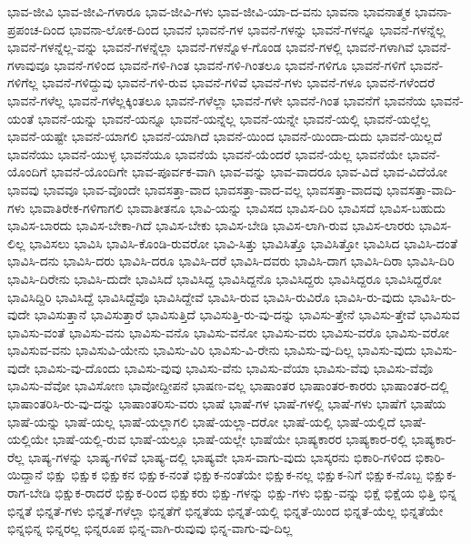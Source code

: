 {ಭಾವ-ಜೀವಿ
ಭಾವ-ಜೀವಿ-ಗಳಾರೂ
ಭಾವ-ಜೀವಿ-ಗಳು
ಭಾವ-ಜೀವಿ-ಯಾ-ದ-ವನು
ಭಾವನಾ
ಭಾವನಾತ್ಮಕ
ಭಾವನಾ-ಪ್ರಪಂಚ-ದಿಂದ
ಭಾವನಾ-ಲೋಕ-ದಿಂದ
ಭಾವನೆ
ಭಾವನೆ-ಗಳ
ಭಾವನೆ-ಗಳನ್ನು
ಭಾವನೆ-ಗಳನ್ನೂ
ಭಾವನೆ-ಗಳನ್ನೆಲ್ಲ
ಭಾವನೆ-ಗಳನ್ನೆಲ್ಲ-ವನ್ನು
ಭಾವನೆ-ಗಳನ್ನೆಲ್ಲಾ
ಭಾವನೆ-ಗಳನ್ನೊಳ-ಗೊಂಡ
ಭಾವನೆ-ಗಳಲ್ಲಿ
ಭಾವನೆ-ಗಳಾಗಿವೆ
ಭಾವನೆ-ಗಳಾವುವೂ
ಭಾವನೆ-ಗಳಿಂದ
ಭಾವನೆ-ಗಳಿ-ಗಿಂತ
ಭಾವನೆ-ಗಳಿ-ಗಿಂತಲೂ
ಭಾವನೆ-ಗಳಿಗೂ
ಭಾವನೆ-ಗಳಿಗೆ
ಭಾವನೆ-ಗಳಿಗೆಲ್ಲ
ಭಾವನೆ-ಗಳಿದ್ದುವು
ಭಾವನೆ-ಗಳಿ-ರುವ
ಭಾವನೆ-ಗಳಿವೆ
ಭಾವನೆ-ಗಳು
ಭಾವನೆ-ಗಳೂ
ಭಾವನೆ-ಗಳೆಂದರೆ
ಭಾವನೆ-ಗಳೆಲ್ಲ
ಭಾವನೆ-ಗಳೆಲ್ಲಕ್ಕಿಂತಲೂ
ಭಾವನೆ-ಗಳೆಲ್ಲಾ
ಭಾವನೆ-ಗಳೇ
ಭಾವನೆ-ಗಿಂತ
ಭಾವನೆಗೆ
ಭಾವನೆಯ
ಭಾವನೆ-ಯಂತೆ
ಭಾವನೆ-ಯನ್ನು
ಭಾವನೆ-ಯನ್ನೂ
ಭಾವನೆ-ಯನ್ನೆಲ್ಲ
ಭಾವನೆ-ಯನ್ನೇ
ಭಾವನೆ-ಯಲ್ಲಿ
ಭಾವನೆ-ಯಲ್ಲೆಲ್ಲ
ಭಾವನೆ-ಯಷ್ಟೇ
ಭಾವನೆ-ಯಾಗಲಿ
ಭಾವನೆ-ಯಾಗಿದೆ
ಭಾವನೆ-ಯಿಂದ
ಭಾವನೆ-ಯಿಂದಾ-ದುದು
ಭಾವನೆ-ಯಿಲ್ಲದೆ
ಭಾವನೆಯು
ಭಾವನೆ-ಯುಳ್ಳ
ಭಾವನೆಯೂ
ಭಾವನೆಯೆ
ಭಾವನೆ-ಯೆಂದರೆ
ಭಾವನೆ-ಯೆಲ್ಲ
ಭಾವನೆಯೇ
ಭಾವನೆ-ಯೊಂದಿಗೆ
ಭಾವನೆ-ಯೊಂದಿಗೇ
ಭಾವ-ಪೂರ್ವಕ-ವಾಗಿ
ಭಾವ-ವನ್ನು
ಭಾವ-ವಾದರೂ
ಭಾವ-ವಿದೆ
ಭಾವ-ವಿದೆಯೋ
ಭಾವವು
ಭಾವವೂ
ಭಾವ-ವೊಂದೇ
ಭಾವಸತ್ತಾ-ವಾದ
ಭಾವಸತ್ತಾ-ವಾದ-ವಲ್ಲ
ಭಾವಸತ್ತಾ-ವಾದವು
ಭಾವಸತ್ತಾ-ವಾದಿ-ಗಳು
ಭಾವಾತಿರೇಕ-ಗಳಿಗಾಗಲಿ
ಭಾವಾತೀತನೂ
ಭಾವಿ-ಯನ್ನು
ಭಾವಿಸದ
ಭಾವಿಸ-ದಿರಿ
ಭಾವಿಸದೆ
ಭಾವಿಸ-ಬಹುದು
ಭಾವಿಸ-ಬಾರದು
ಭಾವಿಸ-ಬೇಕಾ-ಗಿದೆ
ಭಾವಿಸ-ಬೇಕು
ಭಾವಿಸ-ಬೇಡಿ
ಭಾವಿಸ-ಲಾಗಿ-ರುವ
ಭಾವಿಸ-ಲಾರರು
ಭಾವಿಸ-ಲಿಲ್ಲ
ಭಾವಿಸಲು
ಭಾವಿಸಿ
ಭಾವಿಸಿ-ಕೊಂಡಿ-ರುವರೋ
ಭಾವಿ-ಸಿತ್ತು
ಭಾವಿಸಿತ್ತೊ
ಭಾವಿಸಿತ್ತೋ
ಭಾವಿಸಿದ
ಭಾವಿಸಿ-ದಂತೆ
ಭಾವಿಸಿ-ದನು
ಭಾವಿಸಿ-ದರು
ಭಾವಿಸಿ-ದರೂ
ಭಾವಿಸಿ-ದರೆ
ಭಾವಿಸಿ-ದವರು
ಭಾವಿಸಿ-ದಾಗ
ಭಾವಿಸಿ-ದಿರಾ
ಭಾವಿಸಿ-ದಿರಿ
ಭಾವಿಸಿ-ದಿರೇನು
ಭಾವಿಸಿ-ದುದೇ
ಭಾವಿಸಿದೆ
ಭಾವಿಸಿದ್ದ
ಭಾವಿಸಿದ್ದನೊ
ಭಾವಿಸಿದ್ದರು
ಭಾವಿಸಿದ್ದರೂ
ಭಾವಿಸಿದ್ದರೋ
ಭಾವಿಸಿದ್ದಿರಿ
ಭಾವಿಸಿದ್ದೆ
ಭಾವಿಸಿದ್ದೆವೊ
ಭಾವಿಸಿದ್ದೇವೆ
ಭಾವಿಸಿ-ರುವ
ಭಾವಿಸಿ-ರುವಿರೊ
ಭಾವಿಸಿ-ರು-ವುದು
ಭಾವಿಸಿ-ರು-ವುದೇ
ಭಾವಿಸುತ್ತಾನೆ
ಭಾವಿಸುತ್ತಾರೆ
ಭಾವಿಸುತ್ತಿದೆ
ಭಾವಿಸುತ್ತಿ-ರು-ವು-ದನ್ನು
ಭಾವಿಸು-ತ್ತೇನೆ
ಭಾವಿಸು-ತ್ತೇವೆ
ಭಾವಿಸುವ
ಭಾವಿಸು-ವಂತೆ
ಭಾವಿಸು-ವನು
ಭಾವಿಸು-ವನೊ
ಭಾವಿಸು-ವನೋ
ಭಾವಿಸು-ವರು
ಭಾವಿಸು-ವರೊ
ಭಾವಿಸು-ವರೋ
ಭಾವಿಸುವ-ವನು
ಭಾವಿಸುವಿ-ಯೇನು
ಭಾವಿಸು-ವಿರಿ
ಭಾವಿಸು-ವಿ-ರೇನು
ಭಾವಿಸು-ವು-ದಿಲ್ಲ
ಭಾವಿಸು-ವುದು
ಭಾವಿಸು-ವುದೇ
ಭಾವಿಸು-ವು-ದೊಂದು
ಭಾವಿಸು-ವುವು
ಭಾವಿಸು-ವೆನು
ಭಾವಿಸು-ವೆಯಾ
ಭಾವಿಸು-ವೆವು
ಭಾವಿಸು-ವೆವೊ
ಭಾವಿಸು-ವೆವೋ
ಭಾವಿಸೋಣ
ಭಾವೋದ್ದೀಪನೆ
ಭಾಷಣ-ವಲ್ಲ
ಭಾಷಾಂತರ
ಭಾಷಾಂತರ-ಕಾರರು
ಭಾಷಾಂತರ-ದಲ್ಲಿ
ಭಾಷಾಂತರಿಸಿ-ರು-ವು-ದನ್ನು
ಭಾಷಾಂತರಿಸು-ವರು
ಭಾಷೆ
ಭಾಷೆ-ಗಳ
ಭಾಷೆ-ಗಳಲ್ಲಿ
ಭಾಷೆ-ಗಳು
ಭಾಷೆಗೆ
ಭಾಷೆಯ
ಭಾಷೆ-ಯನ್ನು
ಭಾಷೆ-ಯಲ್ಲ
ಭಾಷೆ-ಯಲ್ಲಾಗಲಿ
ಭಾಷೆ-ಯಲ್ಲಾ-ದರೋ
ಭಾಷೆ-ಯಲ್ಲಿ
ಭಾಷೆ-ಯಲ್ಲಿದೆ
ಭಾಷೆ-ಯಲ್ಲಿಯೇ
ಭಾಷೆ-ಯಲ್ಲಿ-ರುವ
ಭಾಷೆ-ಯಲ್ಲೂ
ಭಾಷೆ-ಯಲ್ಲೇ
ಭಾಷೆಯೇ
ಭಾಷ್ಯಕಾರರ
ಭಾಷ್ಯಕಾರ-ರಲ್ಲಿ
ಭಾಷ್ಯಕಾರ-ರೆಲ್ಲ
ಭಾಷ್ಯ-ಗಳನ್ನು
ಭಾಷ್ಯ-ಗಳಿವೆ
ಭಾಷ್ಯ-ದಲ್ಲಿ
ಭಾಷ್ಯವೇ
ಭಾಸ-ವಾಗು-ವುದು
ಭಾಸ್ಕರನು
ಭಿಕಾರಿ-ಗಳಿಂದ
ಭಿಕಾರಿ-ಯಿದ್ದಾನೆ
ಭಿಕ್ಷು
ಭಿಕ್ಷುಕ
ಭಿಕ್ಷುಕನ
ಭಿಕ್ಷುಕ-ನಂತೆ
ಭಿಕ್ಷುಕ-ನಂತೆಯೇ
ಭಿಕ್ಷುಕ-ನಲ್ಲ
ಭಿಕ್ಷುಕ-ನಿಗೆ
ಭಿಕ್ಷುಕ-ನೊಬ್ಬ
ಭಿಕ್ಷುಕ-ರಾಗ-ಬೇಡಿ
ಭಿಕ್ಷುಕ-ರಾದರೆ
ಭಿಕ್ಷುಕ-ರಿಂದ
ಭಿಕ್ಷುಕರು
ಭಿಕ್ಷು-ಗಳನ್ನು
ಭಿಕ್ಷು-ಗಳು
ಭಿಕ್ಷು-ವನ್ನು
ಭಿಕ್ಷೆ
ಭಿಕ್ಷೆಯ
ಭಿತ್ತಿ
ಭಿನ್ನ
ಭಿನ್ನತೆ
ಭಿನ್ನತೆ-ಗಳು
ಭಿನ್ನತೆ-ಗಳೆಲ್ಲಾ
ಭಿನ್ನತೆಗೆ
ಭಿನ್ನತೆಯ
ಭಿನ್ನತೆ-ಯಲ್ಲಿ
ಭಿನ್ನತೆ-ಯಿಂದ
ಭಿನ್ನತೆ-ಯೆಲ್ಲ
ಭಿನ್ನತೆಯೇ
ಭಿನ್ನಭಿನ್ನ
ಭಿನ್ನರಲ್ಲ
ಭಿನ್ನರೂಪ
ಭಿನ್ನ-ವಾಗಿ-ರುವುವು
ಭಿನ್ನ-ವಾಗು-ವು-ದಿಲ್ಲ
}
